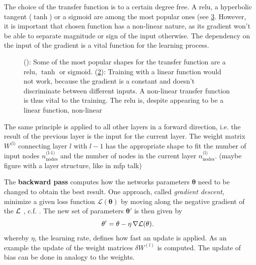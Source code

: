 The choice of the transfer function is to a certain degree free. A \gls{relu}, a hyperbolic tangent ($\tanh$) or a sigmoid are among the most popular ones (see \cref{deeplearning_activation_functions}. However, it is important that chosen function has a non-linear nature, as its gradient won't be able to separate magnitude or sign of the input otherwise. The dependency on the input of the gradient is a vital function for the learning process. 

\begin{figure}
	\begin{subfigure}[c]{0.5\textwidth}
		\centering
		\caption{}
		\label{dltransfer}
	\end{subfigure}
	\begin{subfigure}[c]{0.5\textwidth}
		\centering
		\caption{}
		\label{dltransfergradient}
	\end{subfigure}
	\caption{(): Some of the most popular shapes for the transfer function are a \gls{relu}, $\tanh$ or sigmoid. (\ref{dltransfergradient}): Training with a linear function would not work, because the gradient is a constant and doesn't discriminate between different inputs. A non-linear transfer function is thus vital to the training. The \gls{relu} is, despite appearing to be a linear function, non-linear}
	\label{deeplearning_activation_functions}
	
\end{figure}

The same principle is applied to all other layers in a forward direction, i.e. the result of the previous layer is the input for the current layer. The weight matrix $W^{\text{(l)}}$ connecting layer $l$ with $l-1$ has the appropriate shape to fit the number of input nodes $n^{\text{(l-1)}}_\text{nodes}$ and the number of nodes in the current layer $n^{\text{(l)}}_\text{nodes}$. (maybe figure with a layer structure, like in mfp talk)

\label{backwardpassANN}
The \textbf{backward pass} computes how the networks parameters $\mathbf{\theta}$ need to be changed to obtain the best result. One approach, called \emph{gradient descent}, minimize a given loss function $\mathcal{L}(\mathbf{\theta})$ by moving along the negative gradient of the $\mathcal{L}$ , c.f. \cite{Goodfellow-et-al-2016}. The new set of parameters $\mathbf{\theta'}$ is then given by
\begin{equation}
\mathbf{\theta'} = \mathbf{\theta} - \eta \, \nabla\mathcal{L}(\mathbf{\theta}).
\end{equation}
whereby $\eta$, the learning rate, defines how fast an update is applied. As an example the update of the weight matrices $\delta W^{(l)}$ is computed. The update of bias can be done in analogy to the weights. 

